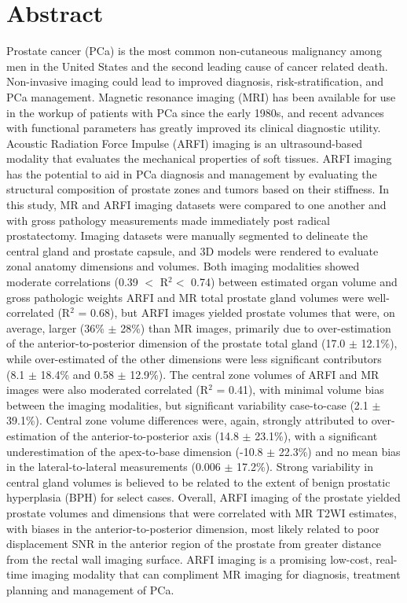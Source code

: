 \section*{Abstract}
Prostate cancer (PCa) is the most common non-cutaneous malignancy among men in
the United States and the second leading cause of cancer related death.
Non-invasive imaging could lead to improved diagnosis, risk-stratification, and
PCa management.  Magnetic resonance imaging (MRI) has been available for use in
the workup of patients with PCa since the early 1980s, and recent advances with
functional parameters has greatly improved its clinical diagnostic utility.
Acoustic Radiation Force Impulse (ARFI) imaging is an ultrasound-based modality
that evaluates the mechanical properties of soft tissues. ARFI imaging has the
potential to aid in PCa diagnosis and management by evaluating the structural
composition of prostate zones and tumors based on their stiffness.  In this
study, MR and ARFI imaging datasets were compared to one another and with gross
pathology measurements made immediately post radical prostatectomy.  Imaging
datasets were manually segmented to delineate the central gland and prostate
capsule, and 3D models were rendered to evaluate zonal anatomy dimensions and
volumes.  Both imaging modalities showed moderate correlations (0.39 $<$ R$^2 <
$ 0.74) between estimated organ volume and gross pathologic weights ARFI and MR
total prostate gland volumes were well-correlated (R$^2$ = 0.68), but ARFI
images yielded prostate volumes that were, on average, larger (36\% $\pm$ 28\%)
than MR images, primarily due to over-estimation of the anterior-to-posterior
dimension of the prostate total gland (17.0 $\pm$ 12.1\%), while over-estimated
of the other dimensions were less significant contributors (8.1 $\pm$ 18.4\%
and 0.58 $\pm$ 12.9\%).  The central zone volumes of ARFI and MR images were
also moderated correlated (R$^2$ = 0.41), with minimal volume bias between the
imaging modalities, but significant variability case-to-case (2.1 $\pm$
39.1\%).  Central zone volume differences were, again, strongly attributed to
over-estimation of the anterior-to-posterior axis (14.8 $\pm$ 23.1\%), with a
significant underestimation of the apex-to-base dimension (-10.8 $\pm$ 22.3\%)
and no mean bias in the lateral-to-lateral measurements (0.006 $\pm$ 17.2\%).
Strong variability in central gland volumes is believed to be related to the
extent of benign prostatic hyperplasia (BPH) for select cases.  Overall, ARFI
imaging of the prostate yielded prostate volumes and dimensions that were
correlated with MR T2WI estimates, with biases in the anterior-to-posterior
dimension, most likely related to poor displacement SNR in the anterior region
of the prostate from greater distance from the rectal wall imaging surface.
ARFI imaging is a promising low-cost, real-time imaging modality that can
compliment MR imaging for diagnosis, treatment planning and management of PCa.
